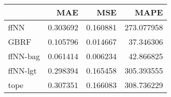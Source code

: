 \begin{tabular}{lrrr}
\toprule
{} &       MAE &       MSE &        MAPE \\
\midrule
ffNN     &  0.303692 &  0.160881 &  273.077958 \\
GBRF     &  0.105796 &  0.014667 &   37.346306 \\
ffNN-bag &  0.061414 &  0.006234 &   42.866825 \\
ffNN-lgt &  0.298394 &  0.165458 &  305.393555 \\
tope     &  0.307351 &  0.166083 &  308.736229 \\
\bottomrule
\end{tabular}
